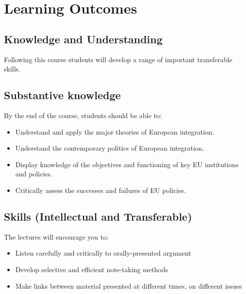 
\section*{Learning Outcomes}

\subsection*{Knowledge and Understanding}

Following this course students will develop a range of important transferable skills. 

\subsection*{Substantive knowledge}

By the end of the course, students should be able to:

\begin{itemize}
	\item Understand and apply the major theories of European integration.
	\item Understand the contemporary politics of European integration.
	\item Display  knowledge of the objectives and functioning of key EU institutions and policies.  
	\item Critically assess the successes and failures of EU policies.
\end{itemize}

\subsection*{Skills (Intellectual and Transferable)}

The lectures will encourage you to:

\begin{itemize}
	\item Listen carefully and critically to orally-presented argument
	\item Develop selective and efficient note-taking methods
	\item Make links between material presented at different times, on different issues
\end{itemize}


